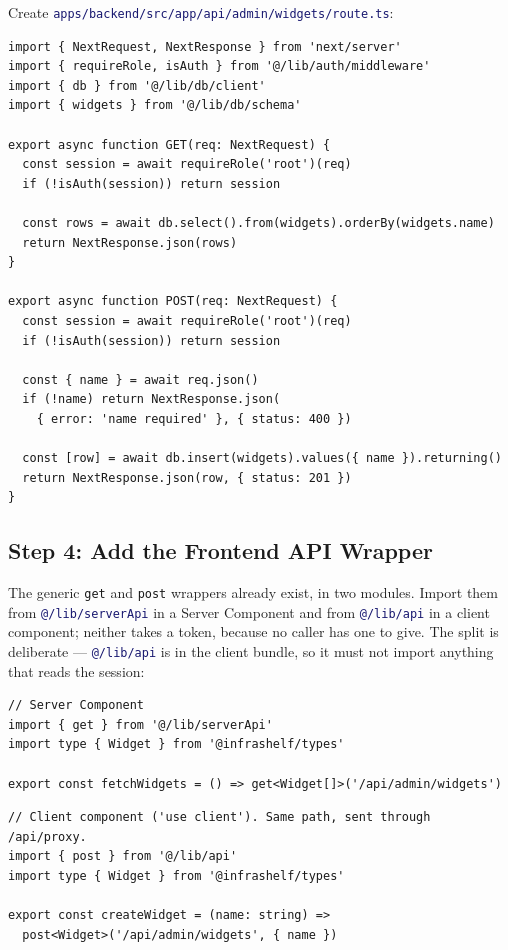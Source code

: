 \documentclass[12pt,a4paper,twoside]{report}
\newcommand{\code}[1]{\texttt{#1}}
\newcommand{\file}[1]{\texttt{\textcolor{MidnightBlue}{#1}}}
\begin{document}
Create \file{apps/backend/src/app/api/admin/widgets/route.ts}:

\begin{lstlisting}[style=typescript]
import { NextRequest, NextResponse } from 'next/server'
import { requireRole, isAuth } from '@/lib/auth/middleware'
import { db } from '@/lib/db/client'
import { widgets } from '@/lib/db/schema'

export async function GET(req: NextRequest) {
  const session = await requireRole('root')(req)
  if (!isAuth(session)) return session

  const rows = await db.select().from(widgets).orderBy(widgets.name)
  return NextResponse.json(rows)
}

export async function POST(req: NextRequest) {
  const session = await requireRole('root')(req)
  if (!isAuth(session)) return session

  const { name } = await req.json()
  if (!name) return NextResponse.json(
    { error: 'name required' }, { status: 400 })

  const [row] = await db.insert(widgets).values({ name }).returning()
  return NextResponse.json(row, { status: 201 })
}
\end{lstlisting}

\subsection{Step 4: Add the Frontend API Wrapper}

The generic \code{get} and \code{post} wrappers already exist, in two modules.
Import them from \file{@/lib/serverApi} in a Server Component and from
\file{@/lib/api} in a client component; neither takes a token, because no caller
has one to give. The split is deliberate --- \file{@/lib/api} is in the client
bundle, so it must not import anything that reads the session:

\begin{lstlisting}[style=typescript]
// Server Component
import { get } from '@/lib/serverApi'
import type { Widget } from '@infrashelf/types'

export const fetchWidgets = () => get<Widget[]>('/api/admin/widgets')
\end{lstlisting}

\begin{lstlisting}[style=typescript]
// Client component ('use client'). Same path, sent through /api/proxy.
import { post } from '@/lib/api'
import type { Widget } from '@infrashelf/types'

export const createWidget = (name: string) =>
  post<Widget>('/api/admin/widgets', { name })
\end{lstlisting}
\end{document}

